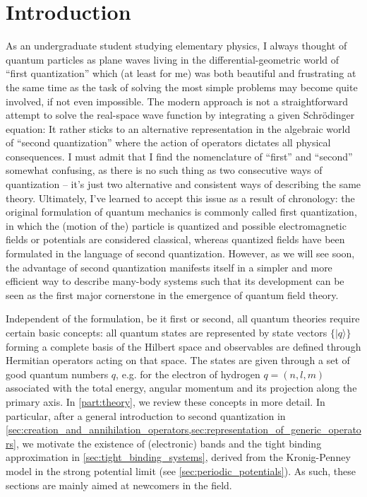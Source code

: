 %
\chapter*{Introduction}
%
As an undergraduate student studying elementary physics, I always thought of quantum particles as plane waves living in the differential-geometric world of ``first quan\-ti\-zation'' which (at least for me) was both beautiful and frustrating at the same time as the task of solving the most simple problems may become quite involved, if not even impossible.
The modern approach is not a straightforward attempt to solve the real-space wave function by integrating a given Schrödinger equation: It rather sticks to an alternative representation in the algebraic world of ``second quantization'' where the action of operators dictates all physical consequences.
I must admit that I find the nomenclature of ``first'' and ``second'' somewhat confusing, as there is no such thing as two consecutive ways of quantization -- it's just two alternative and consistent ways of describing the same theory.
Ultimately, I've learned to accept this issue as a result of chronology: the original formulation of quantum mechanics is commonly called first quantization, in which the (motion of the) particle is quantized and possible electromagnetic fields or potentials are considered classical, whereas quantized fields have been formulated in the language of second quantization.
However, as we will see soon, the advantage of second quantization manifests itself in a simpler and more efficient way to describe many-body systems such that its development can be seen as the first major cornerstone in the emergence of quantum field theory.

Independent of the formulation, be it first or second, all quantum theories require certain basic concepts:
all quantum states are represented by state vectors $\{|q\rangle\}$ forming a complete basis of the Hilbert space and observables are defined through Hermitian operators acting on that space.
The states are given through a set of good quantum numbers $q$, e.g. for the electron of hydrogen $q=(n,l,m)$ associated with the total energy, angular momentum and its projection along the primary axis.
In \cref{part:theory}, we review these concepts in more detail.
In particular, after a general introduction to second quantization in \cref{sec:creation_and_annihilation_operators,sec:representation_of_generic_operators}, we motivate the existence of (electronic) bands and the tight binding approximation in \cref{sec:tight_binding_systems}, derived from the Kronig-Penney model in the strong potential limit (see \cref{sec:periodic_potentials}).
As such, these sections are mainly aimed at newcomers in the field.

